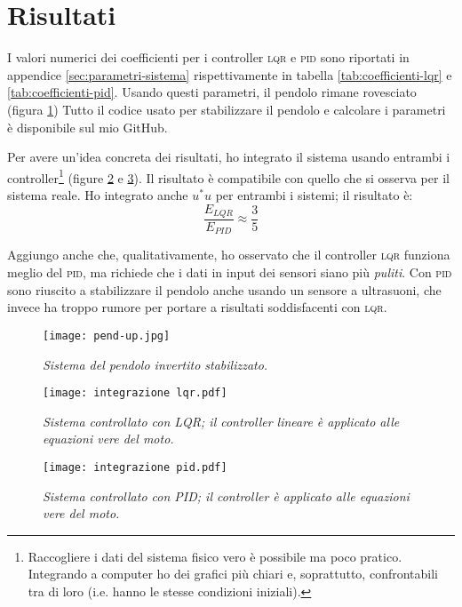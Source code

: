 \section{Risultati}\label{sec:risultati}
I valori numerici dei coefficienti per i controller \textsc{lqr} e \textsc{pid} sono riportati in appendice \ref{sec:parametri-sistema}
rispettivamente in tabella \ref{tab:coefficienti-lqr} e \ref{tab:coefficienti-pid}.
Usando questi parametri, il pendolo rimane rovesciato (figura \ref{fig:pend-up})
Tutto il codice usato per stabilizzare il pendolo e calcolare i parametri è disponibile sul mio GitHub\cite{github}.

Per avere un'idea concreta dei risultati, ho integrato il sistema usando entrambi i controller\footnote{Raccogliere
i dati del sistema fisico vero è possibile ma poco pratico. Integrando a computer ho dei grafici più chiari e, soprattutto,
confrontabili tra di loro (i.e. hanno le stesse condizioni iniziali).} (figure \ref{fig:int-lqr} e \ref{fig:int-pid}).
Il risultato è compatibile con quello che si osserva per il sistema reale.
Ho integrato anche $u^*u$ per entrambi i sistemi; il risultato è:
\begin{equation}
  \frac {E_{LQR} } {E_{PID}} \approx \frac 3 5
  \label{eq:rapporto-u}
\end{equation}

Aggiungo anche che, qualitativamente, ho osservato che il controller \textsc{lqr} funziona meglio del \textsc{pid}, ma
richiede che i dati in input dei sensori siano più \emph{puliti}.
Con \textsc{pid} sono riuscito a stabilizzare il pendolo anche usando un sensore a ultrasuoni, che invece ha troppo
rumore per portare a risultati soddisfacenti con \textsc{lqr}.


\begin{figure}[h]
  \texttt{[image: pend-up.jpg]}
  \caption{\emph{Sistema del pendolo invertito stabilizzato.}}
  \label{fig:pend-up}
\end{figure}

\begin{figure}[h]
  \texttt{[image: integrazione lqr.pdf]}
  \caption{\emph{Sistema controllato con LQR; il controller lineare è applicato alle equazioni vere del moto.}}
  \label{fig:int-lqr}
\end{figure}

\begin{figure}[h]
  \texttt{[image: integrazione pid.pdf]}
  \caption{\emph{Sistema controllato con PID; il controller è applicato alle equazioni vere del moto.}}
  \label{fig:int-pid}
\end{figure}



